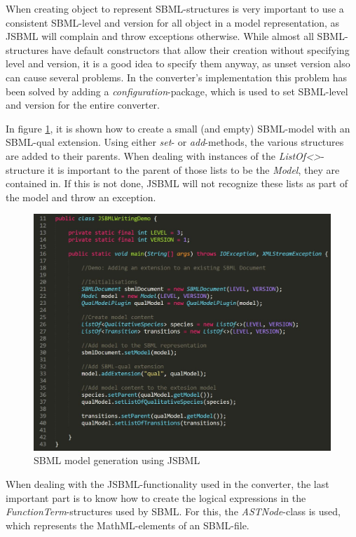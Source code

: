 When creating object to represent SBML-structures is very important to use a consistent SBML-level and version for all object in a model representation, as JSBML will complain and throw exceptions otherwise. While almost all SBML-structures have default constructors that allow their creation without specifying level and version, it is a good idea to specify them anyway, as unset version also can cause several problems. In the converter's implementation this problem has been solved by adding a \emph{configuration}-package, which is used to set SBML-level and version for the entire converter.

In figure \ref{fig:JSBMLCreation}, it is shown how to create a small (and empty) SBML-model with an SBML-qual extension. Using either \emph{set}- or \emph{add}-methods, the various structures are added to their parents. When dealing with instances of the \emph{ListOf<>}-structure it is important to the parent of those lists to be the \emph{Model}, they are contained in. If this is not done, JSBML will not recognize these lists as part of the model and throw an exception. 

\begin{figure}[H]
    \centering
    \includegraphics[scale=0.50]{Sections/Images/JSBMLCreation.JPG}
    \caption{SBML model generation using JSBML}
    \label{fig:JSBMLCreation}
\end{figure}

When dealing with the JSBML-functionality used in the converter, the last important part is to know how to create the logical expressions in the \emph{FunctionTerm}-structures used by SBML. For this, the \emph{ASTNode}-class is used, which represents the MathML-elements of an SBML-file.

